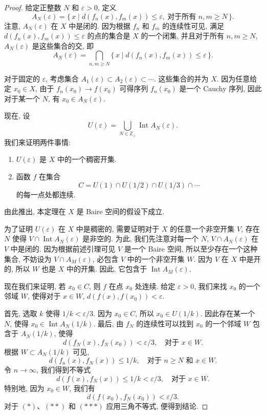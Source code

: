 \begin{proof}
给定正整数 $N$ 和 $\varepsilon>0$, 定义
\[
A_{N}(\varepsilon)=\{\,x\mid d(f_{n}(x),f_{m}(x))\leqslant\varepsilon,\ \text{对于所有 }n,m\geqslant N\,\}.
\]
注意, $A_N(\varepsilon)$ 在 $X$ 中是闭的. 因为根据 $f_n$ 和 $f_m$ 的连续性可见, 满足 $d(f_n(x),f_m(x))\leqslant\varepsilon$ 的点的集合是 $X$ 的一个闭集, 并且对于所有 $n,m\geqslant N$, $A_N(\varepsilon)$ 是这些集合的交, 即
\[
A_{N}(\varepsilon)=\bigcap_{n,m\geqslant N}\{\,x\mid d(f_{n}(x),f_{m}(x))\leqslant\varepsilon\,\}.
\]

对于固定的 $\varepsilon$, 考虑集合 $A_1(\varepsilon)\subset A_2(\varepsilon)\subset\cdots$. 这些集合的并为 $X$. 因为任意给定 $x_0\in X$, 由于 $f_n(x_0)\to f(x_0)$ 可得序列 $f_n(x_0)$ 是一个 Cauchy 序列, 因此对于某一个 $N$, 有 $x_0\in A_N(\varepsilon)$.

现在, 设
\[
U(\varepsilon)=\bigcup_{N\in\mathbb{Z}_{+}}\operatorname{Int}A_{N}(\varepsilon).
\]
我们来证明两件事情:
\begin{enumerate}
\item $U(\varepsilon)$ 是 $X$ 中的一个稠密开集.
\item 函数 $f$ 在集合
\[
C=U(1)\cap U(1/2)\cap U(1/3)\cap\cdots
\]
的每一点处都连续.
\end{enumerate}
由此推出, 本定理在 $X$ 是 Baire 空间的假设下成立.

为了证明 $U(\varepsilon)$ 在 $X$ 中是稠密的, 需要证明对于 $X$ 的任意一个非空开集 $V$, 存在 $N$ 使得 $V\cap\operatorname{Int}A_N(\varepsilon)$ 是非空的. 为此, 我们先注意对每一个 $N$, $V\cap A_N(\varepsilon)$ 在 $V$ 中是闭的. 因为根据前述引理可见 $V$ 是一个 Baire 空间, 所以至少存在一个这种集合, 不妨设为 $V\cap A_M(\varepsilon)$, 必包含 $V$ 中的一个非空开集 $W$. 因为 $V$ 在 $X$ 中是开的, 所以 $W$ 也是 $X$ 中的开集. 因此, 它包含于 $\operatorname{Int}A_M(\varepsilon)$.

现在我们来证明, 若 $x_0\in C$, 则 $f$ 在点 $x_0$ 处连续. 给定 $\varepsilon>0$, 我们来找 $x_0$ 的一个邻域 $W$, 使得对于 $x\in W$, $d(f(x),f(x_0))<\varepsilon$.

首先, 选取 $k$ 使得 $1/k<\varepsilon/3$. 因为 $x_0\in C$, 所以 $x_0\in U(1/k)$. 因此存在某一个 $N$, 使得 $x_0\in\operatorname{Int}A_N(1/k)$. 最后, 由 $f_N$ 的连续性可以找到 $x_0$ 的一个邻域 $W$ 包含于 $A_N(1/k)$, 使得
\[
d(f_{N}(x),f_{N}(x_{0}))<\varepsilon/3,\quad\text{对于 }x\in W. \tag{$*$}
\]
根据 $W\subset A_N(1/k)$ 可见,
\[
d(f_{n}(x),f_{N}(x))\leqslant 1/k,\quad\text{对于 }n\geqslant N\text{ 和 }x\in W.
\]
令 $n\to\infty$, 我们得到不等式
\[
d(f(x),f_{N}(x))\leqslant 1/k<\varepsilon/3,\quad\text{对于 }x\in W. \tag{$**$}
\]
特别地, 因为 $x_0\in W$, 我们有
\[
d(f(x_{0}),f_{N}(x_{0}))<\varepsilon/3. \tag{$***$}
\]
对于 $(*)$、$(**)$ 和 $(***)$ 应用三角不等式, 便得到结论.
\end{proof}

